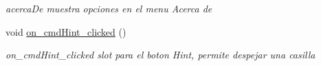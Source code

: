 \begin{DoxyCompactItemize}
\begin{DoxyCompactList}\small\item\em acerca\-De muestra opciones en el menu Acerca de \end{DoxyCompactList}\item 
\hypertarget{class_main_table_a09ae6c5f256a12afafeeda9602579747}{void \hyperlink{class_main_table_a09ae6c5f256a12afafeeda9602579747}{on\-\_\-cmd\-Hint\-\_\-clicked} ()}\label{class_main_table_a09ae6c5f256a12afafeeda9602579747}

\begin{DoxyCompactList}\small\item\em on\-\_\-cmd\-Hint\-\_\-clicked slot para el boton Hint, permite despejar una casilla \end{DoxyCompactList}\end{DoxyCompactItemize}
